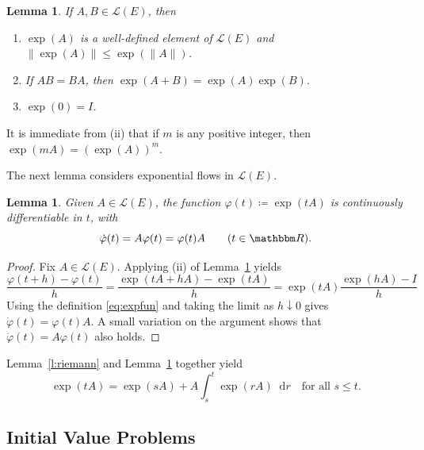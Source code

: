 \documentclass[12pt, reqno]{amsart}
\renewcommand{\leq}{\leqslant}
\newcommand{\1}{\mathbbm 1}
\newcommand*\diff{\mathop{}\!\mathrm{d}}
\newcommand{\lL}{\mathcal L}
\newcommand{\RR}{\mathbbm R}
\renewcommand{\phi}{\varphi}
\theoremstyle{plain}
\newtheorem{lemma}[theorem]{Lemma}
\theoremstyle{definition}
\begin{document}
\begin{lemma}\label{l:expcom}
    If $A, B \in \lL(E)$, then
    \begin{enumerate}
        \item $\exp(A)$ is a well-defined element of $\lL(E)$  and $\| \exp(A) \| \leq \exp(\|A\|)$.
        \item If $AB = BA$, then $\exp(A + B) =
            \exp(A) \exp(B)$.
        \item $\exp(0) = I$.
    \end{enumerate}
\end{lemma}

It is immediate from (ii) that if $m$ is any positive integer, then $\exp(mA) =
(\exp(A))^m$.

The next lemma considers exponential flows in $\lL(E)$.

\begin{lemma}\label{l:expcom2}
    Given $A \in \lL(E)$, the function $\phi(t) \coloneq \exp(tA)$ is
    continuously differentiable in $t$, with
    \begin{equation}\label{eq:matdiffl}
        \dot \phi(t) = A \phi(t) = \phi(t) A
        \qquad (t \in \RR).
    \end{equation}
\end{lemma}


\begin{proof}
    Fix $A \in \lL(E)$. Applying (ii) of Lemma~\ref{l:expcom} yields
    \begin{equation*}
        \frac{\phi(t + h) - \phi(t)}{h}
        = \frac{\exp(tA + hA) - \exp(tA)}{h}
        = \exp(tA) \frac{\exp(hA) - I}{h}
    \end{equation*}
    Using the definition \eqref{eq:expfun} and taking the limit as $h \downarrow
    0$ gives $\dot \phi(t) = \phi(t) A $.  A small variation on the argument 
    shows that $\dot \phi(t) = A \phi(t)$ also holds.
\end{proof}



Lemma~\ref{l:riemann} and Lemma~\ref{l:expcom2} together yield
%
\begin{equation}\label{eq:ftcexp}
    \exp(t A) 
     =  \exp(s A) + A \int_s^t \exp(r A) \diff r \quad \text{for all } s \leq t.
\end{equation}
%




\subsection{Initial Value Problems}\label{ss:boundedivp}
\end{document}
